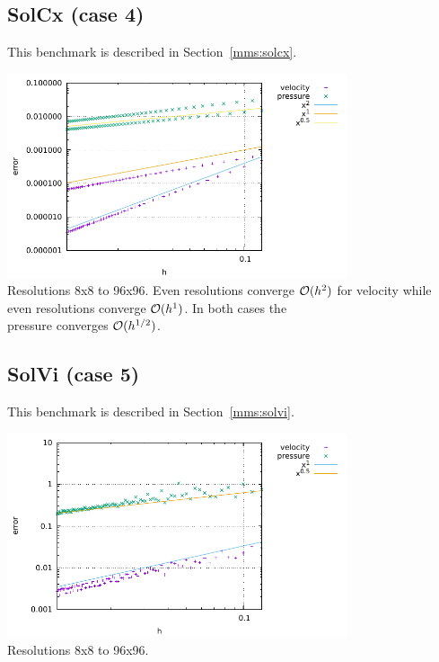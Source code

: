 \subsection*{SolCx (case 4)} 

This benchmark is described in Section~\ref{mms:solcx}.

\begin{center}
\includegraphics[width=10cm]{python_codes/fieldstone_22/results/case4/errors.pdf}\\
{\captionfont Resolutions 8x8 to 96x96. Even resolutions converge ${\cal O}(h^2)$ 
for velocity while \\ even resolutions converge ${\cal O}(h^1)$. In both cases the \\
pressure converges ${\cal O}(h^{1/2})$.}
\end{center}


\subsection*{SolVi (case 5)} 

This benchmark is described in Section~\ref{mms:solvi}.

\begin{center}
\includegraphics[width=10cm]{python_codes/fieldstone_22/results/case5/errors.pdf}\\
{\captionfont Resolutions 8x8 to 96x96.} 
\end{center}

